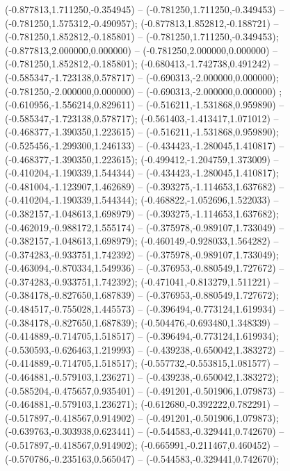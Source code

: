  (-0.877813,1.711250,-0.354945) -- (-0.781250,1.711250,-0.349453) -- (-0.781250,1.575312,-0.490957);
 (-0.877813,1.852812,-0.188721) -- (-0.781250,1.852812,-0.185801) -- (-0.781250,1.711250,-0.349453);
 (-0.877813,2.000000,0.000000) -- (-0.781250,2.000000,0.000000) -- (-0.781250,1.852812,-0.185801);
 (-0.680413,-1.742738,0.491242) -- (-0.585347,-1.723138,0.578717) -- (-0.690313,-2.000000,0.000000);
 (-0.781250,-2.000000,0.000000) -- (-0.690313,-2.000000,0.000000) ;
 (-0.610956,-1.556214,0.829611) -- (-0.516211,-1.531868,0.959890) -- (-0.585347,-1.723138,0.578717);
 (-0.561403,-1.413417,1.071012) -- (-0.468377,-1.390350,1.223615) -- (-0.516211,-1.531868,0.959890);
 (-0.525456,-1.299300,1.246133) -- (-0.434423,-1.280045,1.410817) -- (-0.468377,-1.390350,1.223615);
 (-0.499412,-1.204759,1.373009) -- (-0.410204,-1.190339,1.544344) -- (-0.434423,-1.280045,1.410817);
 (-0.481004,-1.123907,1.462689) -- (-0.393275,-1.114653,1.637682) -- (-0.410204,-1.190339,1.544344);
 (-0.468822,-1.052696,1.522033) -- (-0.382157,-1.048613,1.698979) -- (-0.393275,-1.114653,1.637682);
 (-0.462019,-0.988172,1.555174) -- (-0.375978,-0.989107,1.733049) -- (-0.382157,-1.048613,1.698979);
 (-0.460149,-0.928033,1.564282) -- (-0.374283,-0.933751,1.742392) -- (-0.375978,-0.989107,1.733049);
 (-0.463094,-0.870334,1.549936) -- (-0.376953,-0.880549,1.727672) -- (-0.374283,-0.933751,1.742392);
 (-0.471041,-0.813279,1.511221) -- (-0.384178,-0.827650,1.687839) -- (-0.376953,-0.880549,1.727672);
 (-0.484517,-0.755028,1.445573) -- (-0.396494,-0.773124,1.619934) -- (-0.384178,-0.827650,1.687839);
 (-0.504476,-0.693480,1.348339) -- (-0.414889,-0.714705,1.518517) -- (-0.396494,-0.773124,1.619934);
 (-0.530593,-0.626463,1.219993) -- (-0.439238,-0.650042,1.383272) -- (-0.414889,-0.714705,1.518517);
 (-0.557732,-0.553815,1.081577) -- (-0.464881,-0.579103,1.236271) -- (-0.439238,-0.650042,1.383272);
 (-0.585204,-0.475657,0.935401) -- (-0.491201,-0.501906,1.079873) -- (-0.464881,-0.579103,1.236271);
 (-0.612680,-0.392222,0.782291) -- (-0.517897,-0.418567,0.914902) -- (-0.491201,-0.501906,1.079873);
 (-0.639763,-0.303938,0.623441) -- (-0.544583,-0.329441,0.742670) -- (-0.517897,-0.418567,0.914902);
 (-0.665991,-0.211467,0.460452) -- (-0.570786,-0.235163,0.565047) -- (-0.544583,-0.329441,0.742670);
